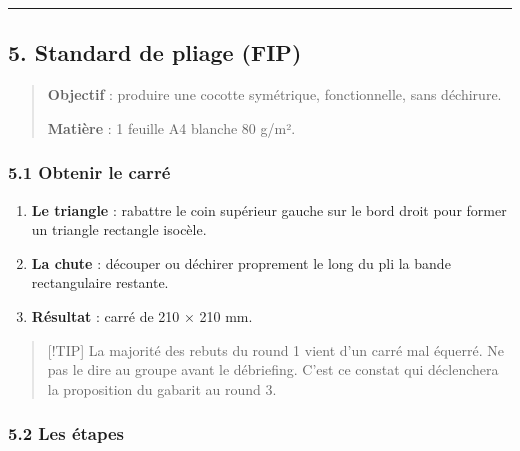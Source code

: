\documentclass[
]{article}
\providecommand{\tightlist}{%
  \setlength{\itemsep}{0pt}\setlength{\parskip}{0pt}}
\begin{document}
\begin{center}\rule{0.5\linewidth}{0.5pt}\end{center}

\subsection{5. Standard de pliage (FIP)}\label{standard-de-pliage-fip}

\begin{quote}
\textbf{Objectif} : produire une cocotte symétrique, fonctionnelle, sans
déchirure.

\textbf{Matière} : 1 feuille A4 blanche 80 g/m².
\end{quote}

\subsubsection{5.1 Obtenir le carré}\label{obtenir-le-carruxe9}

\begin{enumerate}
\def\labelenumi{\arabic{enumi}.}
\tightlist
\item
  \textbf{Le triangle} : rabattre le coin supérieur gauche sur le bord
  droit pour former un triangle rectangle isocèle.
\item
  \textbf{La chute} : découper ou déchirer proprement le long du pli la
  bande rectangulaire restante.
\item
  \textbf{Résultat} : carré de 210 × 210 mm.
\end{enumerate}

\begin{quote}
{[}!TIP{]} La majorité des rebuts du round 1 vient d'un carré mal
équerré. Ne pas le dire au groupe avant le débriefing. C'est ce constat
qui déclenchera la proposition du gabarit au round 3.
\end{quote}

\subsubsection{5.2 Les étapes}\label{les-uxe9tapes}
\end{document}

